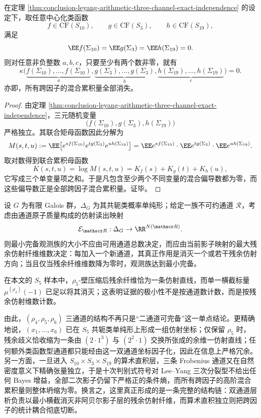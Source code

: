 \begin{theorem}[三通道跨因子混合累积量的整体湮灭]\label{thm:conclusion-leyang-three-channel-mixed-cumulants-vanish}
在定理 \ref{thm:conclusion-leyang-arithmetic-three-channel-exact-independence} 的设定下，取任意中心化类函数
\[
f\in \mathrm{CF}(S_{10}),\qquad
g\in \mathrm{CF}(S_{3}),\qquad
h\in \mathrm{CF}(S_{19}),
\]
满足
\[
\EE f(\Sigma_{10})=\EE g(\Sigma_3)=\EE h(\Sigma_{19})=0.
\]
则对任意非负整数 \(a,b,c\)，只要至少有两个数非零，就有
\[
\kappa\bigl(
\underbrace{f(\Sigma_{10}),\dots,f(\Sigma_{10})}_{a},
\underbrace{g(\Sigma_{3}),\dots,g(\Sigma_{3})}_{b},
\underbrace{h(\Sigma_{19}),\dots,h(\Sigma_{19})}_{c}
\bigr)=0.
\]
亦即，所有跨因子的混合累积量全部消失。
\end{theorem}
\begin{proof}
由定理 \ref{thm:conclusion-leyang-arithmetic-three-channel-exact-independence}，三元随机变量
\[
\bigl(f(\Sigma_{10}),g(\Sigma_3),h(\Sigma_{19})\bigr)
\]
严格独立。其联合矩母函数因此分解为
\[
M(s,t,u)
:=
\EE\bigl[e^{sf(\Sigma_{10})}e^{tg(\Sigma_3)}e^{uh(\Sigma_{19})}\bigr]
=
\EE e^{sf(\Sigma_{10})}\cdot
\EE e^{tg(\Sigma_3)}\cdot
\EE e^{uh(\Sigma_{19})}.
\]
取对数得到联合累积母函数
\[
K(s,t,u)=\log M(s,t,u)=K_f(s)+K_g(t)+K_h(u),
\]
它写成三个单变量项之和。于是凡包含至少两个不同变量的混合偏导数都为零，而这些偏导数正是全部跨因子混合累积量。证毕。
\end{proof}

\begin{conjecture}[最小完备非阿贝尔证据族由残余仿射纤维维数决定]\label{conj:conclusion-leyang-minimal-nonabelian-evidence-rank}
设 \(G\) 为有限 Galois 群，\(\Delta_G\) 为其共轭类概率单纯形；给定一族不可约通道 \(\mathscr R\)，考虑由通道原子质量构成的仿射读出映射
\[
\mathcal E_{\mathscr R}:\Delta_G\to \RR^{N(\mathscr R)}.
\]
则最小完备观测族的大小不应由可用通道总数决定，而应由当前影子映射的最大残余仿射纤维维数决定：每加入一个新通道，其真正作用是消灭一个或若干残余仿射方向；当且仅当残余纤维维数降为零时，观测族达到最小完备。

在本文的 \(S_5\) 样本中，\(\rho_5\)-壁压缩后残余纤维恰为一条仿射直线，而单一横截标量 \(\mu^{(\rho_4)}(-1)\) 已足以将其消灭；这表明证据的极小性不是按通道数计数，而是按残余仿射维数计数。
\end{conjecture}

由此，\((\rho_4,\rho_5,\rho_6)\) 三通道的结构不再只是“二通道可完备”这一单点结论。更精确地说，\((x_1,\dots,x_6)\) 已在 \(S_5\) 共轭类单纯形上形成一组仿射坐标；仅保留 \(\rho_5\) 时，残余歧义恰收缩为一条由 \((2\cdot1^3)\) 与 \((2^2\cdot1)\) 交换所张成的余维一仿射直线；任何额外类函数型通道都只能经由这一双通道坐标因子化，因此在信息上严格冗余。另一方面，一旦进入 \(S_{10}\times S_3\times S_{19}\) 的算术直积层，三条 Frobenius 通道又在自然密度意义下精确张量独立，于是十次判别式符号对 Lee--Yang 三次分裂型不给出任何 Bayes 增益，全部二次影子仍留下严格正的条件熵，而所有跨因子的高阶混合累积量则整体坍缩为零。换言之，这里真正形成的是一条完整的结构链：双通道层析负责以最小横截消灭非阿贝尔影子层的残余仿射纤维，而算术直积独立则把跨因子的统计耦合彻底切断。

\endinput
